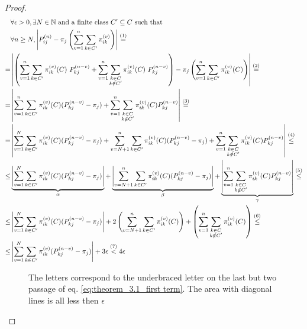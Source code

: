 \begin{proof}
		\setlength{\mathindent}{-1.5cm} %

		\begin{equation}\begin{split} \label{eq:theorem_3.1_first term}
			& \forall \epsilon > 0, \exists N \in \mathbb{N} \text{ and a finite class } C' \subseteq C \text{ such that } \\
			& \forall n \ge N, \left| P_{ij}^{(n)} - \pi_j \left( \sum_{v = 1}^{n} \sum_{k \in C'} \pi_{ik}^{(v)} \right) \right| \stackrel{(1)}{=}
			\\
			= & \left|
				\left(
					\sum_{v = 1}^{n} \sum_{k \in C'} \pi_{ik}^{(v)}(C) ~ P_{kj}^{(n-v)} + \sum_{v = 1}^{n} \sum_{\substack{k \in C \\ k \notin C'}} \pi_{ik}^{(v)}(C) ~ P_{kj}^{(n-v)} \right)
				- \pi_j \left( \sum_{v = 1}^{n} \sum_{k \in C'} \pi_{ik}^{(v)}(C) \right)
				\right| \stackrel{(2)}{=}
			\\
			= & \left| \sum_{v = 1}^{n} \sum_{k \in C'} \pi_{ik}^{(v)}(C) (P_{kj}^{(n-v)} - \pi_j)
				+ \sum_{v = 1}^{n} \sum_{\substack{k \in C \\ k \notin C'}} \pi_{ik}^{(v)}(C) P_{kj}^{(n-v)} \right| \stackrel{(3)}{=}
			\\
			= & \left| \sum_{v = 1}^{N} \sum_{k \in C'} \pi_{ik}^{(v)}(C) (P_{kj}^{(n-v)} - \pi_j) +
				\sum_{v = N+1}^{n} \sum_{k \in C'} \pi_{ik}^{(v)}(C) (P_{kj}^{(n-v)} - \pi_j) +
				\sum_{v = 1}^{n} \sum_{\substack{k \in C \\ k \notin C'}} \pi_{ik}^{(v)}(C) P_{kj}^{(n-v)} \right| \stackrel{(4)}{\le}
			\\
			\le & \underbrace{\left| \sum_{v = 1}^{N} \sum_{k \in C'} \pi_{ik}^{(v)}(C) (P_{kj}^{(n-v)} - \pi_j) \right|}_{\alpha} +
				\underbrace{\left| \sum_{v = N+1}^{n} \sum_{k \in C'} \pi_{ik}^{(v)}(C) (P_{kj}^{(n-v)} - \pi_j) \right|}_{\beta} +
				\underbrace{\left| \sum_{v = 1}^{n} \sum_{\substack{k \in C \\ k \notin C'}} \pi_{ik}^{(v)}(C) P_{kj}^{(n-v)} \right|}_{\gamma} \stackrel{(5)}{\le}
			\\
			\le & \left| \sum_{v = 1}^{N} \sum_{k \in C'} \pi_{ik}^{(v)}(C) (P_{kj}^{(n-v)} - \pi_j) \right| +
				2 \left( \sum_{v = N+1}^{n} \sum_{k \in C'} \pi_{ik}^{(v)}(C) \right) +
				\left( \sum_{v = 1}^{n} \sum_{\substack{k \in C \\ k \notin C'}} \pi_{ik}^{(v)}(C) \right) \stackrel{(6)}{\le}
			\\
			\le & \left| \sum_{v = 1}^{N} \sum_{k \in C'} \pi_{ik}^{(v)} (P_{kj}^{(n-v)} - \pi_j) \right| + 3 \epsilon \stackrel{(7)}{<} 4 \epsilon
		\end{split}\end{equation}
		\begin{figure}
			
			\caption{The letters correspond to the underbraced letter on the last but two passage of eq. \eqref{eq:theorem_3.1_first term}. The area with diagonal lines is all less then $\epsilon$}
			\label{fig:th3_1}
		\end{figure}
		\setlength{\mathindent}{0cm} %


\end{proof}
